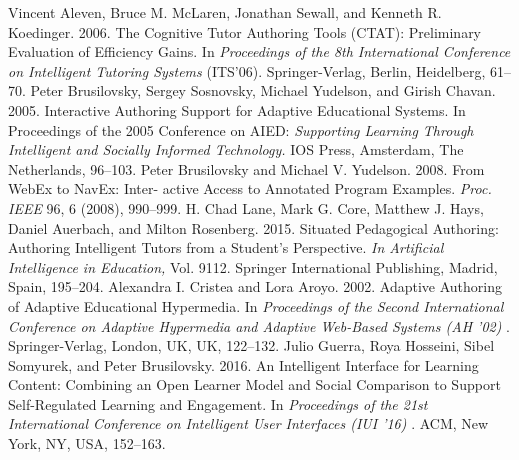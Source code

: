 \documentclass{sig-alternate}
\begin{document}
\begin{thebibliography}{14}
Vincent Aleven, Bruce M. McLaren, Jonathan Sewall, and Kenneth R. Koedinger.
2006. The Cognitive Tutor Authoring Tools (CTAT): Preliminary Evaluation of
Efficiency Gains. In \textit{Proceedings of the 8th International Conference on Intelligent
Tutoring Systems}  (ITS’06). Springer-Verlag, Berlin, Heidelberg, 61–70.
Peter Brusilovsky, Sergey Sosnovsky, Michael Yudelson, and Girish Chavan. 2005.
Interactive Authoring Support for Adaptive Educational Systems. In Proceedings
of the 2005 Conference on AIED: \textit{Supporting Learning Through Intelligent and
Socially Informed Technology. } IOS Press, Amsterdam, The Netherlands, 96–103.
Peter Brusilovsky and Michael V. Yudelson. 2008. From WebEx to NavEx: Inter-
active Access to Annotated Program Examples. \textit{ Proc. IEEE} 96, 6 (2008), 990–999.
H. Chad Lane, Mark G. Core, Matthew J. Hays, Daniel Auerbach, and Milton
Rosenberg. 2015. Situated Pedagogical Authoring: Authoring Intelligent Tutors
from a Student’s Perspective. \textit{In Artificial Intelligence in Education,}  Vol. 9112.
Springer International Publishing, Madrid, Spain, 195–204.
Alexandra I. Cristea and Lora Aroyo. 2002. Adaptive Authoring of Adaptive
Educational Hypermedia. In \textit{Proceedings of the Second International Conference on
Adaptive Hypermedia and Adaptive Web-Based Systems (AH ’02)} . Springer-Verlag,
London, UK, UK, 122–132.
Julio Guerra, Roya Hosseini, Sibel Somyurek, and Peter Brusilovsky. 2016. An
Intelligent Interface for Learning Content: Combining an Open Learner Model
and Social Comparison to Support Self-Regulated Learning and Engagement. In \textit{Proceedings of the 21st International Conference on Intelligent User Interfaces (IUI
’16)}
. ACM, New York, NY, USA, 152–163.

\end{thebibliography}
\balancecolumns
\end{document}

